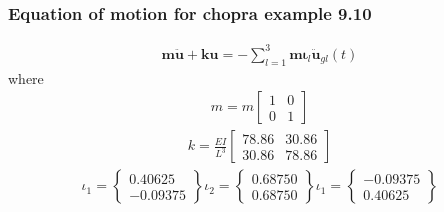 \documentclass[letterpaper,10pt,english]{sphinxmanual}
\begin{document}
\subsubsection{Equation of motion for chopra example 9.10}
\label{\detokenize{examples/05_MIMO_Event:Equation-of-motion-for-chopra-example-9.10}}\begin{equation*}
\begin{split}\mathbf{m}\mathbf{\ddot{u}} + \mathbf{k}\mathbf{u}
= -\sum_{l=1}^{3}\mathbf{m}\mathbf{\iota}_l\mathbf{\ddot{u}}_{gl}(t)\end{split}
\end{equation*}
\sphinxAtStartPar
where
\begin{equation*}
\begin{split}m = m\begin{bmatrix}
1 & 0 \\
0 & 1
\end{bmatrix}\end{split}
\end{equation*}\begin{equation*}
\begin{split}k = \frac{EI}{L^3}\begin{bmatrix}
78.86 & 30.86 \\
30.86 & 78.86
\end{bmatrix}\end{split}
\end{equation*}\begin{equation*}
\begin{split}\iota_1 = \begin{Bmatrix}0.40625\\-0.09375\end{Bmatrix}
\iota_2 = \begin{Bmatrix}0.68750\\0.68750\end{Bmatrix}
\iota_1 = \begin{Bmatrix}-0.09375\\0.40625\end{Bmatrix}\end{split}
\end{equation*}
\end{document}
